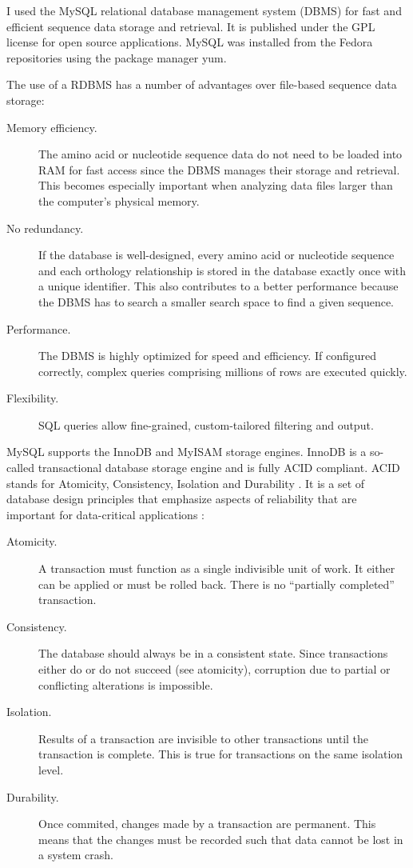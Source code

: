 I used the MySQL relational database management system (DBMS) 
for fast and efficient sequence data storage and retrieval. It is published
under the GPL license for open source applications. MySQL was installed from the
Fedora repositories using the package manager yum.

The use of a RDBMS has a number of advantages over file-based sequence
data storage:

\begin{description}
	\item[Memory efficiency.] The amino acid or nucleotide sequence data do not
		need to be loaded into RAM for fast access since the DBMS manages their
		storage and retrieval.  This becomes especially important when analyzing data
		files larger than the computer's physical memory.
	\item[No redundancy.] If the database is well-designed, every amino acid or
		nucleotide sequence and each orthology relationship is stored in the database
		exactly once with a unique identifier. This also contributes to a better
		performance because the DBMS has to search a smaller search space to find a
		given sequence.
	\item[Performance.] The DBMS is highly optimized for speed and efficiency. If
		configured correctly, complex queries comprising millions of rows are
		executed quickly.
	\item[Flexibility.] SQL queries allow fine-grained, custom-tailored filtering
		and output.
\end{description}

MySQL supports the InnoDB \citep{mysql2012} and MyISAM \citep{mysql2012} storage
engines. InnoDB is a so-called transactional database storage engine and is
fully ACID compliant. ACID stands for Atomicity, Consistency, Isolation and
Durability \citep{haerder1983}. It is a set of database design principles that
emphasize aspects of reliability that are important for data-critical
applications \citep{schwartz2012}:

\begin{description}
	\item[Atomicity.] A transaction must function as a single indivisible unit of
		work. It either can be applied or must be rolled back. There is no
		``partially completed'' transaction.
	\item[Consistency.] The database should always be in a consistent state. Since
		transactions either do or do not succeed (see atomicity), corruption due to
		partial or conflicting alterations is impossible.
	\item[Isolation.] Results of a transaction are invisible to other
		transactions until the transaction is complete. This is true for
		transactions on the same isolation level.
	\item[Durability.] Once commited, changes made by a transaction are permanent.
		This means that the changes must be recorded such that data cannot be lost
		in a system crash. 
\end{description}

